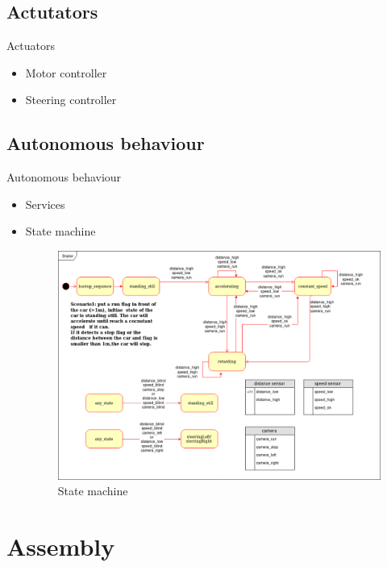 \documentclass{beamer}
\begin{document}
\subsection{Actutators}
\begin{frame}{Actuators}
 \begin{itemize}
  \item Motor controller
  \item Steering controller
 \end{itemize}

\end{frame}
\subsection{Autonomous behaviour}

\begin{frame}{Autonomous behaviour}
 \begin{itemize}
  \item Services
  \item State machine
  \begin{figure}
    \includegraphics[width=0.7\linewidth]{statemachine.png}
    \caption{State machine}
  \end{figure}
 \end{itemize}

\end{frame}


\section{Assembly}
\end{document}
